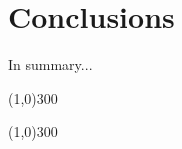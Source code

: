 
\section{Conclusions}
\label{sec:conclusions}

In summary...

\begin{center}
\line(1,0){300}
\end{center}

\begin{center}
\line(1,0){300}
\end{center}